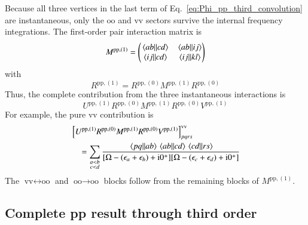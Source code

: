 \documentclass[aip,jcp,reprint,noshowkeys,superscriptaddress]{revtex4-1}
\newcommand{\eps}{\epsilon}
\newcommand{\ii}{\mathrm{i}}
\newcommand{\pp}{\text{pp}}
\begin{document}
Because all three vertices in the last term of
Eq.~\eqref{eq:Phi_pp_third_convolution} are instantaneous, only the
$\text{oo}$ and $\text{vv}$ sectors survive the internal frequency integrations.
The first-order pair interaction matrix is
\begin{equation}
    M^{\pp,(1)}
    =
    \begin{pmatrix}
    \mel{ab}{}{cd}&\mel{ab}{}{ij}
    \\
    \mel{ij}{}{cd}&\mel{ij}{}{kl}
    \end{pmatrix}
    \label{eq:M_pp_first}
\end{equation}
with
\begin{equation}
    R^{\pp,(1)}
    =
    R^{\pp,(0)}M^{\pp,(1)}R^{\pp,(0)}
    \label{eq:R_pp_first}
\end{equation}
Thus, the complete contribution from the three instantaneous interactions is
\begin{equation}
    U^{\pp,(1)}R^{\pp,(0)}M^{\pp,(1)}R^{\pp,(0)}V^{\pp,(1)}
    \label{eq:Phi_pp_third_three_bare}
\end{equation}
For example, the pure $\text{vv}$ contribution is
\begin{equation}
\begin{split}
    &\left[
    U^{\pp,(1)}R^{\pp,(0)}M^{\pp,(1)}R^{\pp,(0)}V^{\pp,(1)}
    \right]_{pqrs}^{\text{vv}}
    \\
    &\quad=
    \sum_{\substack{a<b\\c<d}}
    \frac{
    \mel{pq}{}{ab}\mel{ab}{}{cd}\mel{cd}{}{rs}
    }
    {[\Omega-(\eps_a+\eps_b)+\ii0^+]
     [\Omega-(\eps_c+\eps_d)+\ii0^+]}
\end{split}
\label{eq:Phi_pp_third_central_vv}
\end{equation}
The $\text{vv}\leftrightarrow\text{oo}$ and $\text{oo}\to\text{oo}$ blocks follow from the remaining
blocks of $M^{\pp,(1)}$.

\subsection{Complete pp result through third order}
\end{document}
